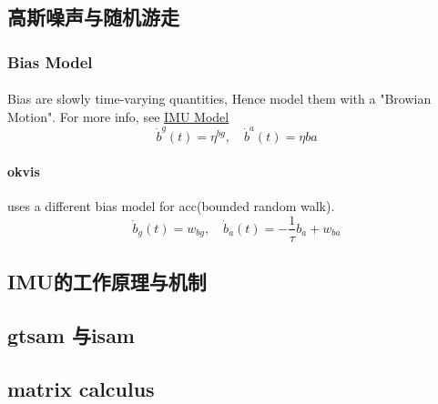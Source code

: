 \documentclass[10pt,a4paper]{article}
\begin{document}
\subsection{高斯噪声与随机游走}
\subsubsection{Bias Model}
\paragraph{}Bias are slowly time-varying quantities, Hence model them with a "Browian Motion".
For more info, see \href{http://www.cnblogs.com/youzx/p/6291327.html?utm_source=itdadao&utm_medium=referral}{IMU Model}
\begin{equation}
\dot{b}^g(t) = \eta^{bg}, \quad \dot{b}^a(t) = \eta{ba}
\end{equation}

\paragraph{okvis} uses a different bias model for acc(bounded random walk).
\begin{equation}
\dot{b}_g(t) = w_{bg}, \quad \dot{b}_a(t) = -\frac{1}{\tau} b_a + w_{ba}
\end{equation}
\subsection{IMU的工作原理与机制}
\subsection{gtsam 与isam}
\subsection{matrix calculus}
\end{document}

